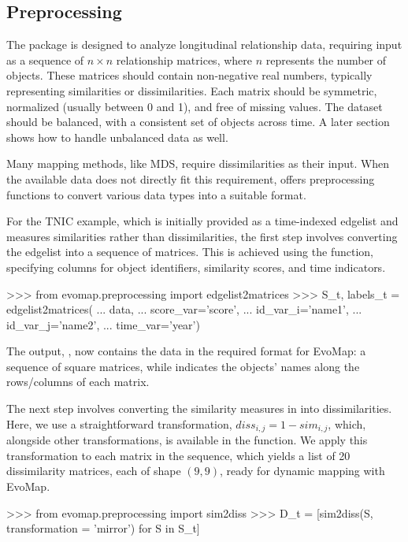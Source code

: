 \documentclass[article]{jss}
\begin{document}
\subsection{Preprocessing}

The  package is designed to analyze longitudinal relationship data, requiring input as 
a sequence of $n \times n$ relationship matrices, where $n$ represents the number of objects. 
These matrices should contain non-negative real numbers, typically representing similarities or dissimilarities. 
Each matrix should be symmetric, normalized (usually between 0 and 1), and free of missing values. 
The dataset should be balanced, with a consistent set of objects across time. 
A later section shows how to handle unbalanced data as well.

Many mapping methods, like MDS, require dissimilarities as their input. When the available data 
does not directly fit this requirement,  offers preprocessing functions to convert various 
data types into a suitable format. 

For the TNIC example, which is initially provided as a time-indexed edgelist and measures 
similarities rather than dissimilarities, the first step involves converting the edgelist 
into a sequence of matrices. This is achieved using the  function,
specifying columns for object identifiers, similarity scores, and time indicators. 

\begin{Code}
>>> from evomap.preprocessing import edgelist2matrices
>>> S_t, labels_t = edgelist2matrices(
...     data,
...     score_var='score',
...     id_var_i='name1',
...     id_var_j='name2',
...     time_var='year')  
\end{Code}

The output, , now contains the data in the required format for EvoMap: a sequence of square matrices, 
while  indicates the objects' names along the rows/columns of each matrix.

The next step involves converting the similarity measures in  into dissimilarities. 
Here, we use a straightforward transformation, $diss_{i,j} = 1 - sim_{i,j}$, which, alongside 
other transformations, is available in the  function. 
We apply this transformation to each matrix in the sequence, which yields a list of 20 dissimilarity matrices, 
each of shape $(9,9)$, ready for dynamic mapping with EvoMap.

\begin{Code}
>>> from evomap.preprocessing import sim2diss
>>> D_t = [sim2diss(S, transformation = 'mirror') for S in S_t]
\end{Code}
  
\end{document}
